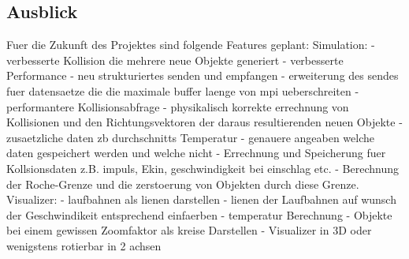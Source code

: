 \subsection{Ausblick}
Fuer die Zukunft des Projektes sind folgende Features geplant:
    Simulation:
        - verbesserte Kollision die mehrere neue Objekte generiert
        - verbesserte Performance
        - neu strukturiertes senden und empfangen
        - erweiterung des sendes fuer datensaetze die die maximale
          buffer laenge von mpi ueberschreiten
        - performantere Kollisionsabfrage
        - physikalisch korrekte errechnung von Kollisionen und den
          Richtungsvektoren der daraus resultierenden neuen Objekte
        - zusaetzliche daten zb durchschnitts Temperatur
        - genauere angeaben welche daten gespeichert werden und welche nicht
        - Errechnung und Speicherung fuer Kollsionsdaten z.B. impuls, Ekin,
          geschwindigkeit bei einschlag etc.
        - Berechnung der Roche-Grenze und die zerstoerung von Objekten 
          durch diese Grenze.
    Visualizer:
        - laufbahnen als lienen darstellen
        - lienen der Laufbahnen auf wunsch der Geschwindikeit entsprechend
          einfaerben
        - temperatur Berechnung
        - Objekte bei einem gewissen Zoomfaktor als kreise Darstellen
        - Visualizer in 3D oder wenigstens rotierbar in 2 achsen

